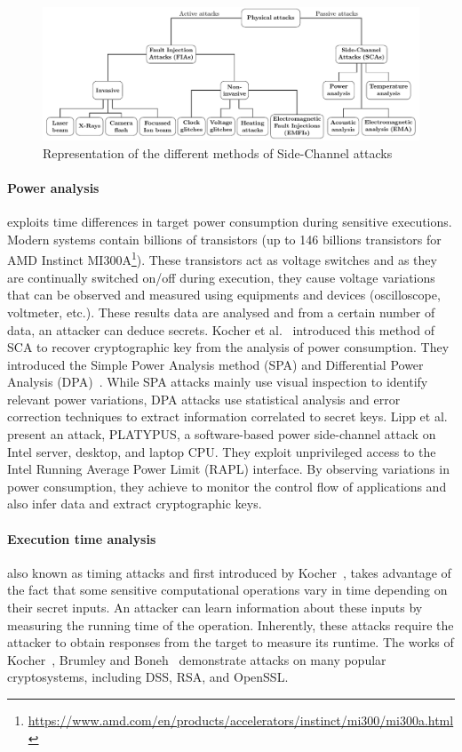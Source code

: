 \begin{figure}[ht]
    \centering
    \includegraphics[page=3, width=.75\textwidth]{c2_soa/img/physicalAttacks.pdf}
    \caption{Representation of the different methods of Side-Channel attacks}
    \label{fig:sca}
\end{figure}

\paragraph{Power analysis} exploits time differences in target power consumption during sensitive executions. Modern systems contain billions of transistors (up to 146 billions transistors for AMD Instinct MI300A\footnote{\url{https://www.amd.com/en/products/accelerators/instinct/mi300/mi300a.html}}). These transistors act as voltage switches and as they are continually switched on/off during execution, they cause voltage variations that can be observed and measured using equipments and devices (oscilloscope, voltmeter, etc.). These results data are analysed and from a certain number of data, an attacker can deduce secrets.
Kocher et al.~\cite{KJJ-98-crypto,KJJR-11-jce} introduced this method of SCA to recover cryptographic key from the analysis of power consumption. They introduced the Simple Power Analysis method (SPA) and Differential Power Analysis (DPA)~\cite{GP-99-ches}. While SPA attacks mainly use visual inspection to identify relevant power variations, DPA attacks use statistical analysis and error correction techniques to extract information correlated to secret keys.
Lipp et al.~\cite{LKOSECG-21-sp} present an attack, PLATYPUS, a software-based power side-channel attack on Intel server, desktop, and laptop CPU. They exploit unprivileged access to the Intel Running Average Power Limit (RAPL) interface. By observing variations in power consumption, they achieve to monitor the control flow of applications and also infer data and extract cryptographic keys.

\paragraph{Execution time analysis} also known as timing attacks and first introduced by Kocher~\cite{K-96-crypto}, takes advantage of the fact that some sensitive computational operations vary in time depending on their secret inputs. An attacker can learn information about these inputs by measuring the running time of the operation. Inherently, these attacks require the attacker to obtain responses from the target to measure its runtime. The works of Kocher~\cite{K-96-crypto}, Brumley and Boneh~\cite{DD-05-compnet} demonstrate attacks on many popular cryptosystems, including DSS, RSA, and OpenSSL.

